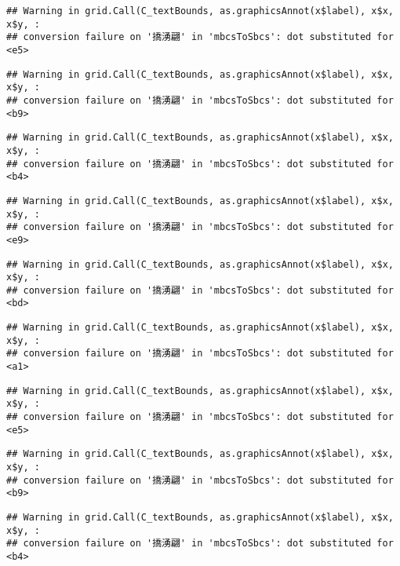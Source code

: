 \documentclass[
]{article}
\begin{document}
\begin{verbatim}
## Warning in grid.Call(C_textBounds, as.graphicsAnnot(x$label), x$x, x$y, :
## conversion failure on '撟湧翩' in 'mbcsToSbcs': dot substituted for <e5>
\end{verbatim}

\begin{verbatim}
## Warning in grid.Call(C_textBounds, as.graphicsAnnot(x$label), x$x, x$y, :
## conversion failure on '撟湧翩' in 'mbcsToSbcs': dot substituted for <b9>
\end{verbatim}

\begin{verbatim}
## Warning in grid.Call(C_textBounds, as.graphicsAnnot(x$label), x$x, x$y, :
## conversion failure on '撟湧翩' in 'mbcsToSbcs': dot substituted for <b4>
\end{verbatim}

\begin{verbatim}
## Warning in grid.Call(C_textBounds, as.graphicsAnnot(x$label), x$x, x$y, :
## conversion failure on '撟湧翩' in 'mbcsToSbcs': dot substituted for <e9>
\end{verbatim}

\begin{verbatim}
## Warning in grid.Call(C_textBounds, as.graphicsAnnot(x$label), x$x, x$y, :
## conversion failure on '撟湧翩' in 'mbcsToSbcs': dot substituted for <bd>
\end{verbatim}

\begin{verbatim}
## Warning in grid.Call(C_textBounds, as.graphicsAnnot(x$label), x$x, x$y, :
## conversion failure on '撟湧翩' in 'mbcsToSbcs': dot substituted for <a1>
\end{verbatim}

\begin{verbatim}
## Warning in grid.Call(C_textBounds, as.graphicsAnnot(x$label), x$x, x$y, :
## conversion failure on '撟湧翩' in 'mbcsToSbcs': dot substituted for <e5>
\end{verbatim}

\begin{verbatim}
## Warning in grid.Call(C_textBounds, as.graphicsAnnot(x$label), x$x, x$y, :
## conversion failure on '撟湧翩' in 'mbcsToSbcs': dot substituted for <b9>
\end{verbatim}

\begin{verbatim}
## Warning in grid.Call(C_textBounds, as.graphicsAnnot(x$label), x$x, x$y, :
## conversion failure on '撟湧翩' in 'mbcsToSbcs': dot substituted for <b4>
\end{verbatim}
\end{document}
